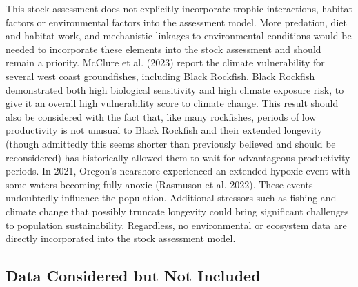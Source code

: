 \documentclass[11pt,
  english,
  letterpaper,
]{article}
\begin{document}
This stock assessment does not explicitly incorporate trophic interactions, habitat factors or environmental factors into the assessment model. More predation, diet and habitat work, and mechanistic linkages to environmental conditions would be needed to incorporate these elements into the stock assessment and should remain a priority. McClure et al. (2023) report the climate vulnerability for several west coast groundfishes, including Black Rockfish. Black Rockfish demonstrated both high biological sensitivity and high climate exposure risk, to give it an overall high vulnerability score to climate change. This result should also be considered with the fact that, like many rockfishes, periods of low productivity is not unusual to Black Rockfish and their extended longevity (though admittedly this seems shorter than previously believed and should be reconsidered) has historically allowed them to wait for advantageous productivity periods. In 2021, Oregon's nearshore experienced an extended hypoxic event with some waters becoming fully anoxic (Rasmuson et al. 2022). These events undoubtedly influence the population. Additional stressors such as fishing and climate change that possibly truncate longevity could bring significant challenges to population sustainability. Regardless, no environmental or ecosystem data are directly incorporated into the stock assessment model.

\hypertarget{data-considered-but-not-included}{%
\subsection{Data Considered but Not Included}\label{data-considered-but-not-included}}
\end{document}

